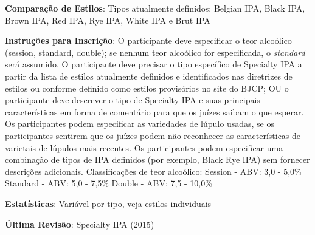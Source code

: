 \textbf{Comparação de Estilos}: Tipos atualmente definidos: Belgian IPA, Black IPA, Brown IPA, Red IPA, Rye IPA, White IPA e Brut IPA

\textbf{Instruções para Inscrição}: O participante deve especificar o teor alcoólico (session, standard, double); se nenhum teor alcoólico for especificada, o \textit{standard} será assumido. O participante deve precisar o tipo específico de Specialty IPA a partir da lista de estilos atualmente definidos e identificados nas diretrizes de estilos ou conforme definido como estilos provisórios no site do BJCP; OU o participante deve descrever o tipo de Specialty IPA e suas principais características em forma de comentário para que os juízes saibam o que esperar. Os participantes podem especificar as variedades de lúpulo usadas, se os participantes sentirem que os juízes podem não reconhecer as características de varietais de lúpulos mais recentes. Os participantes podem especificar uma combinação de tipos de IPA definidos (por exemplo, Black Rye IPA) sem fornecer descrições adicionais. Classificações de teor alcoólico: Session - ABV: 3,0 - 5,0\% Standard - ABV: 5,0 - 7,5\% Double - ABV: 7,5 - 10,0\%

\textbf{Estatísticas}: Variável por tipo, veja estilos individuais

\textbf{Última Revisão}: Specialty IPA (2015)